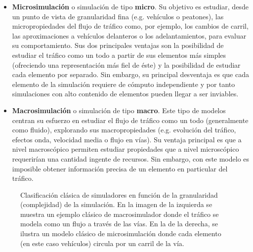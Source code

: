 \begin{itemize}
	\item \textbf{Microsimulación} o simulación de tipo \textbf{micro}. Su objetivo es estudiar, desde un punto de vista de granularidad fina (e.g. vehículos o peatones), las micropropiedades del flujo de tráfico como, por ejemplo, los cambios de carril, las aproximaciones a vehículos delanteros o los adelantamientos, para evaluar su comportamiento. Sus dos principales ventajas son la posibilidad de estudiar el tráfico como un todo a partir de sus elementos más simples (ofreciendo una representación más fiel de éste) y la posibilidad de estudiar cada elemento por separado. Sin embargo, su principal desventaja es que cada elemento de la simulación requiere de cómputo independiente y por tanto simulaciones con alto contenido de elementos pueden llegar a ser inviables.
	\item \textbf{Macrosimulación} o simulación de tipo \textbf{macro}. Este tipo de modelos centran su esfuerzo en estudiar el flujo de tráfico como un todo (generalmente como fluido), explorando sus macropropiedades (e.g. evolución del tráfico, efectos onda, velocidad media o flujo en vías). Su ventaja principal es que a nivel macroscópico permiten estudiar propiedades que a nivel microscópico requerirían una cantidad ingente de recursos. Sin embargo, con este modelo es imposible obtener información precisa de un elemento en particular del tráfico.
\end{itemize}

\begin{figure}[!b]
	\centering
	\qquad
	\caption[Clasificación de simuladores según granularidad]{Clasificación clásica de simuladores en función de la granularidad (complejidad) de la simulación. En la imagen de la izquierda se muestra un ejemplo clásico de macrosimulador donde el tráfico se modela como un flujo a través de las vías. En la de la derecha, se ilustra un modelo clásico de microsimulación donde cada elemento (en este caso vehículos) circula por un carril de la vía.}
	\label{fig:granularities-in-traffic-simulation}
\end{figure}

